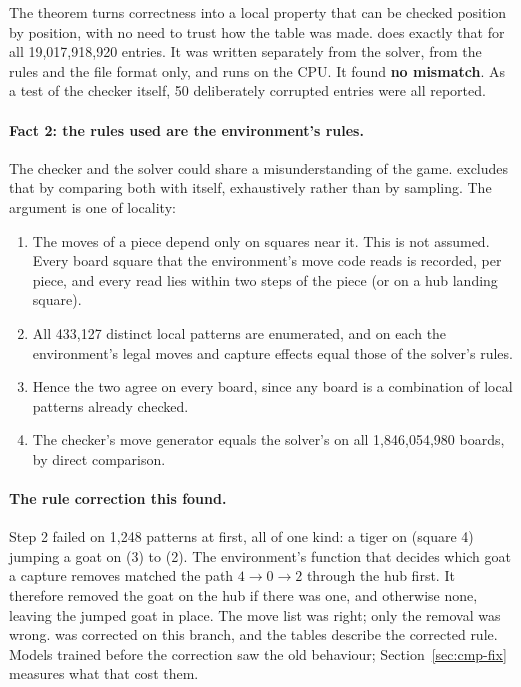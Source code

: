 The theorem turns correctness into a local property that can be checked position by position, with no need
to trust how the table was made.  does exactly that for all 19{,}017{,}918{,}920 entries. It
was written separately from the solver, from the rules and the file format only, and runs on the CPU. It
found \textbf{no mismatch}. As a test of the checker itself, 50 deliberately corrupted entries were all reported.

\paragraph{Fact 2: the rules used are the environment's rules.} The checker and the solver could share a
misunderstanding of the game.  excludes that by comparing both with  itself,
exhaustively rather than by sampling. The argument is one of locality:
\begin{enumerate}
\item The moves of a piece depend only on squares near it. This is not assumed. Every board square that the
  environment's move code reads is recorded, per piece, and every read lies within two steps of the piece
  (or on a hub landing square).
\item All 433{,}127 distinct local patterns are enumerated, and on each the environment's legal moves and
  capture effects equal those of the solver's rules.
\item Hence the two agree on every board, since any board is a combination of local patterns already
  checked.
\item The checker's move generator equals the solver's on all 1{,}846{,}054{,}980 boards, by direct comparison.
\end{enumerate}

\paragraph{The rule correction this found.}\label{sec:rulefix} Step 2 failed on 1{,}248 patterns at first, all
of one kind: a tiger on  (square 4) jumping a goat on  (3) to  (2). The environment's
function that decides which goat a capture removes matched the path $4 \to 0 \to 2$ through the hub first. It
therefore removed the goat on the hub if there was one, and otherwise none, leaving the jumped goat in
place. The move list was right; only the removal was wrong.  was corrected on this branch,
and the tables describe the corrected rule. Models trained before the correction saw the old behaviour;
Section~\ref{sec:cmp-fix} measures what that cost them.

